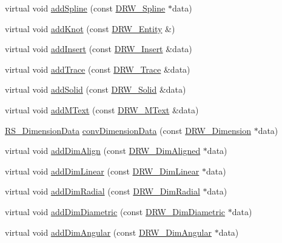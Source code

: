 \begin{DoxyCompactItemize}
virtual void \hyperlink{classRS__FilterDXFRW_a9d8a8b0492b8741ec12e4bae32206c5a}{add\-Spline} (const \hyperlink{classDRW__Spline}{D\-R\-W\-\_\-\-Spline} $\ast$data)
\item 
virtual void \hyperlink{classRS__FilterDXFRW_a383331cf8aa84246271eff85b8ff698a}{add\-Knot} (const \hyperlink{classDRW__Entity}{D\-R\-W\-\_\-\-Entity} \&)
\item 
virtual void \hyperlink{classRS__FilterDXFRW_a777d6d48017df24833b35600d5e17e13}{add\-Insert} (const \hyperlink{classDRW__Insert}{D\-R\-W\-\_\-\-Insert} \&data)
\item 
virtual void \hyperlink{classRS__FilterDXFRW_add8e481c7ef136d7dadd985fbe983dba}{add\-Trace} (const \hyperlink{classDRW__Trace}{D\-R\-W\-\_\-\-Trace} \&data)
\item 
virtual void \hyperlink{classRS__FilterDXFRW_a63b5c6d925dd7b170f2356abb78fa51a}{add\-Solid} (const \hyperlink{classDRW__Solid}{D\-R\-W\-\_\-\-Solid} \&data)
\item 
virtual void \hyperlink{classRS__FilterDXFRW_a6ce81647206b2c4a88c8367adff0333f}{add\-M\-Text} (const \hyperlink{classDRW__MText}{D\-R\-W\-\_\-\-M\-Text} \&data)
\item 
\hyperlink{classRS__DimensionData}{R\-S\-\_\-\-Dimension\-Data} \hyperlink{classRS__FilterDXFRW_abde2105265789767dc204618051e6655}{conv\-Dimension\-Data} (const \hyperlink{classDRW__Dimension}{D\-R\-W\-\_\-\-Dimension} $\ast$data)
\item 
virtual void \hyperlink{classRS__FilterDXFRW_a10d7b9906ec9cf5b3267e060244020d9}{add\-Dim\-Align} (const \hyperlink{classDRW__DimAligned}{D\-R\-W\-\_\-\-Dim\-Aligned} $\ast$data)
\item 
virtual void \hyperlink{classRS__FilterDXFRW_a133f4262b19476895f9353cf950f6055}{add\-Dim\-Linear} (const \hyperlink{classDRW__DimLinear}{D\-R\-W\-\_\-\-Dim\-Linear} $\ast$data)
\item 
virtual void \hyperlink{classRS__FilterDXFRW_a527740cdcf9f07687df0598340ac18b0}{add\-Dim\-Radial} (const \hyperlink{classDRW__DimRadial}{D\-R\-W\-\_\-\-Dim\-Radial} $\ast$data)
\item 
virtual void \hyperlink{classRS__FilterDXFRW_a2656280adee1453695c15798f0e1c7d8}{add\-Dim\-Diametric} (const \hyperlink{classDRW__DimDiametric}{D\-R\-W\-\_\-\-Dim\-Diametric} $\ast$data)
\item 
virtual void \hyperlink{classRS__FilterDXFRW_a573fd385cd9279bbb883f780336d6600}{add\-Dim\-Angular} (const \hyperlink{classDRW__DimAngular}{D\-R\-W\-\_\-\-Dim\-Angular} $\ast$data)
\item 

\end{DoxyCompactItemize}
